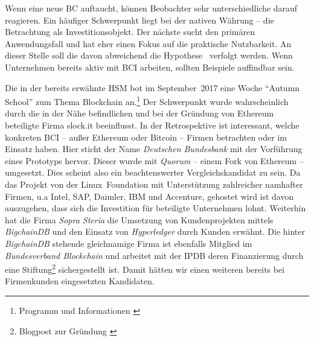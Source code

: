 

Wenn eine neue \gls{BC} auftaucht, können Beobachter sehr unterschiedliche darauf reagieren.
Ein häufiger Schwerpunkt liegt bei der nativen Währung -- die Betrachtung als Investitionsobjekt.
Der nächste sucht den primären Anwendungsfall und hat eher einen Fokus auf die praktische Nutzbarkeit.
An dieser Stelle soll die davon abweichend die Hypothese~ verfolgt werden.
Wenn Unternehmen bereits aktiv mit \gls{BCI} arbeiten, sollten Beispiele auffindbar sein.

Die in der  bereits erwähnte \gls{HSM} bot im September~2017 eine Woche \enquote{Autumn School} zum Thema Blockchain an.\footnote{Programm und Informationen \autocite{w:hsmw-bccm-as}}
Der Schwerpunkt wurde wahrscheinlich durch die in der Nähe befindlichen und bei der Gründung von Ethereum beteiligte Firma \mbox{slock.it} beeinflusst.
In der Retrospektive ist interessant, welche konkreten \gls{BCI} -- außer Ethereum oder Bitcoin -- Firmen betrachten oder im Einsatz haben.
Hier sticht der Name \emph{Deutschen Bundesbank} mit der Vorführung eines Prototyps hervor.
Dieser wurde mit \emph{Quorum} -- einem Fork von Ethereum -- umgesetzt. Dies scheint also ein beachtenswerter Vergleichskandidat zu sein.
Da das Projekt von der \mbox{Linux Foundation} mit Unterstützung zahlreicher namhafter Firmen, u.a Intel, SAP, Daimler, IBM und Accenture, gehostet wird ist davon auszugehen, dass sich die Investition für beteiligte Unternehmen lohnt.
Weiterhin hat die Firma \emph{Sopra Steria} die Umsetzung von Kundenprojekten mittels \emph{BigchainDB} und den Einsatz von \emph{Hyperledger} durch Kunden erwähnt.
Die hinter \emph{BigchainDB} stehende gleichnamige Firma ist ebenfalls Mitglied im \emph{Bundesverband Blockchain} und arbeitet mit der \gls{IPDB} deren Finanzierung durch eine Stiftung\footnote{Blogpost zur Gründung \autocite{w:ipdb-foundation}} sichergestellt ist.
Damit hätten wir einen weiteren bereits bei Firmenkunden eingesetzten Kandidaten.


